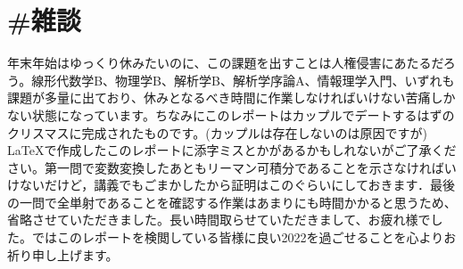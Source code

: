 \documentclass[dvipdfmx]{jreport}
\begin{document}
\section{\#雑談}
年末年始はゆっくり休みたいのに、この課題を出すことは人権侵害にあたるだろう。線形代数学B、物理学B、解析学B、解析学序論A、情報理学入門、いずれも課題が多量に出ており、休みとなるべき時間に作業しなければいけない苦痛しかない状態になっています。ちなみにこのレポートはカップルでデートするはずのクリスマスに完成されたものです。(カップルは存在しないのは原因ですが) \LaTeX で作成したこのレポートに添字ミスとかがあるかもしれないがご了承ください。第一問で変数変換したあともリーマン可積分であることを示さなければいけないだけど，講義でもごまかしたから証明はこのぐらいにしておきます．最後の一問で全単射であることを確認する作業はあまりにも時間かかると思うため、省略させていただきました。長い時間取らせていただきまして、お疲れ様でした。ではこのレポートを検閲している皆様に良い2022を過ごせることを心よりお祈り申し上げます。
\end{document}
